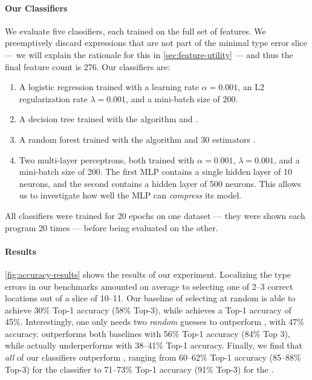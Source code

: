 \paragraph{Our Classifiers}
We evaluate five classifiers, each trained on the full set of features.
%
We preemptively discard expressions that are not part of the minimal
type error slice --- we will explain the rationale for this in
\autoref{sec:feature-utility} --- and thus the final feature count is
276.
%
Our classifiers are:
%
\begin{enumerate}
\item A logistic regression trained with a learning rate
  $\alpha = 0.001$, an L2 regularization rate $\lambda = 0.001$, and a
  mini-batch size of 200.
\item A decision tree trained with the  algorithm and .
\item A random forest trained with the  algorithm and 30 estimators .
\item Two multi-layer perceptrons, both trained with $\alpha = 0.001$,
  $\lambda = 0.001$, and a mini-batch size of 200. The first MLP
  contains a single hidden layer of 10 neurons, and the second contains
  a hidden layer of 500 neurons. This allows us to investigate how well
  the MLP can \emph{compress} its model.
\end{enumerate}
%
All classifiers were trained for 20 epochs on one dataset
--- \ie they were shown each program 20 times ---
before being evaluated on the other.



\paragraph{Results}
\autoref{fig:accuracy-results} shows the results of our experiment.
%
Localizing the type errors in our benchmarks amounted on average to
selecting one of 2--3 correct locations out of a slice of 10--11.
%
Our baseline of selecting at random is able to achieve 30\% Top-1
accuracy (58\% Top-3), while \ocaml achieves a Top-1 accuracy of 45\%.
%
Interestingly, one only needs two \emph{random} guesses to outperform
\ocaml, with 47\% accuracy.
%
\sherrloc outperforms both baselines with 56\% Top-1 accuracy (84\% Top
3), while \mycroft actually underperforms \ocaml with 38--41\% Top-1
accuracy.
%
Finally, we find that \emph{all} of our classifiers outperform \sherrloc,
ranging from 60--62\% Top-1 accuracy (85--88\% Top-3) for the \linear
classifier to 71--73\% Top-1 accuracy (91\% Top-3) for the \hiddenFH.

